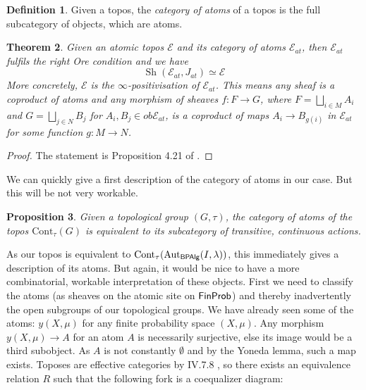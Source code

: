 \documentclass[a4paper]{amsproc}
\theoremstyle{plain}
\newtheorem{theorem}{Theorem}[section]
\newtheorem{proposition}[theorem]{Proposition}
\theoremstyle{definition}
\newtheorem{definition}[theorem]{Definition}
\theoremstyle{remark}
\numberwithin{equation}{section}
\DeclareMathOperator{\Sh}{Sh}
\newcommand{\FinProb}{\textup{\textsf{FinProb}}}
\newcommand{\BPAlg}{\textup{\textsf{BPAlg}}}
\begin{document}
\begin{definition} Given a topos, the \emph{category of atoms} of a topos is the full subcategory of objects, which are atoms.
\end{definition}
\begin{theorem}
Given an atomic topos $\mathcal{E}$ and its category of atoms $\mathcal{E}_{at}$, then $\mathcal{E}_{at}$ fulfils the right Ore condition and we have
\[\Sh(\mathcal{E}_{at},J_{at})\simeq \mathcal{E} \]
More concretely, $\mathcal{E}$ is the $\infty$-positivisation of $\mathcal{E}_{at}$. This means any sheaf is a coproduct of atoms and any morphism of sheaves $f: F\rightarrow G$, where $F=\bigsqcup_{i\in M} A_i$ and $G=\bigsqcup_{j\in N} B_j$ for $A_i,B_j\in ob\mathcal{E}_{at}$, is a coproduct of maps $A_i\rightarrow B_{g(i)}$ in $\mathcal{E}_{at}$ for some function $g:M\rightarrow N$.
\end{theorem}
\begin{proof}
The statement is Proposition 4.21 of \cite{caramello}. %
\end{proof}
We can quickly give a first description of the category of atoms in our case. But this will be not very workable.
\begin{proposition} Given a topological group $(G,\tau)$, the category of atoms of the topos $\text{Cont}_\tau (G)$ is equivalent to its subcategory of transitive, continuous actions. \cite{XYZ}
\end{proposition}
As our topos is equivalent to $\text{Cont}_\tau(\text{Aut}_{\BPAlg}(I,\lambda))$, this immediately gives a description of its atoms.
But again, it would be nice to have a more combinatorial, workable interpretation of these objects. First we need to classify the atoms (as sheaves on the atomic site on $\FinProb$) and thereby inadvertently the open subgroups of our topological groups.
\newline
\indent We have already seen some of the atoms: $y (X,\mu)$ for any finite probability space $(X,\mu)$. Any morphism $y (X,\mu)\rightarrow A$ for an atom $A$ is necessarily surjective, else its image would be a third subobject. As $A$ is not constantly $\emptyset$ and by the Yoneda lemma, such a map exists. Toposes are effective categories by IV.7.8 \cite{sheaves_geometry_logic}, so there exists an equivalence relation $R$ such that the following fork is a coequalizer diagram:
\begin{center}

\end{center}
\end{document}
